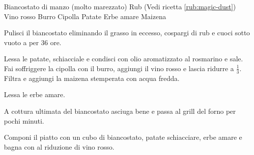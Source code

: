 \begin{ingreds}
	Biancostato di manzo (molto marezzato)	
	Rub (Vedi ricetta \ref{rub:magic-dust})
	Vino rosso
	Burro
	Cipolla
	Patate
	Erbe amare
	Maizena

\end{ingreds}

\begin{method}
Pulisci il biancostato eliminando il grasso in eccesso, cospargi di rub e cuoci sotto vuoto a  per 36 ore.

Lessa le patate, schiacciale e condisci con olio aromatizzato al rosmarino e sale. Fai soffriggere la cipolla con il burro, aggiungi il vino rosso e lascia ridurre a $\frac{1}{3}$. Filtra e aggiungi la maizena stemperata con acqua fredda.

Lessa le erbe amare.

A cottura ultimata del biancostato asciuga bene e passa al grill del forno per pochi minuti.

Componi il piatto con un cubo di biancostato, patate schiacciare, erbe amare  e bagna con al riduzione di vino rosso.


\end{method}



